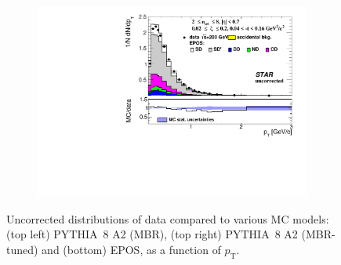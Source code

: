 \begin{figure}[h!]
\begin{subfigure}{.49\textwidth}
		\includegraphics[width=\linewidth, page=1]{chapters/chrgSTAR/img/nonSD/chrg/SDT_epos_xi0_RP_starsim_pt.pdf}
	\end{subfigure}
	\begin{minipage}{.49\textwidth}
		\caption{Uncorrected distributions of data compared to various MC models: (top left) PYTHIA~8 A2 (MBR), (top right) PYTHIA~8 A2 (MBR-tuned) and (bottom) EPOS, as a function of $p_{\mathrm{T}}$.}
		\label{fig:nonSDpt}
	\end{minipage}
	
\end{figure}
